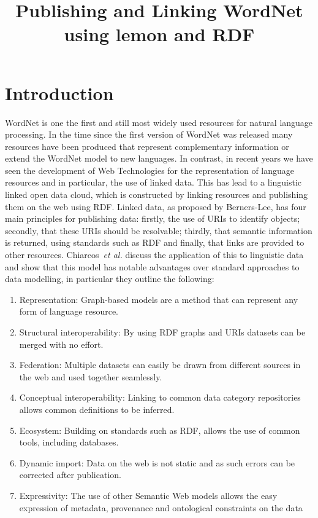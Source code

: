 \documentclass[10pt, a4paper]{article}
\title{Publishing and Linking WordNet using lemon and RDF}
\begin{document}
\maketitleabstract

\section{Introduction}

WordNet is one the first and still most widely used resources for natural
language processing. In the time since the first version of WordNet was released many
resources have been produced that represent complementary information\cite{?,?} or extend
the WordNet model to new languages\cite{?,?}. In contrast, in recent years we have seen
the development of Web Technologies for the representation of language resources
and in particular, the use of linked data. This has lead to a linguistic linked
open data cloud, which is constructed by linking resources and publishing them
on the web using RDF. Linked data, as proposed by Berners-Lee\cite{?}, has four
main principles for publishing data: firstly, the use of URIs to identify
objects; secondly, that these URIs should be resolvable; thirdly, that semantic
information is returned, using standards such as RDF and finally, that links are
provided to other resources. Chiarcos~\emph{et al.}\cite{?} discuss the
application of this to linguistic data and show that this model has notable
advantages over standard approaches to data modelling, in particular they
outline the following:

\begin{enumerate}
    \item Representation: Graph-based models are a method that can represent any
        form of language resource.
    \item Structural interoperability: By using RDF graphs and URIs datasets can
        be merged with no effort.
    \item Federation: Multiple datasets can easily be drawn from different
        sources in the web and used together seamlessly.
    \item Conceptual interoperability: Linking to common data category
        repositories allows common definitions to be inferred.
    \item Ecosystem: Building on standards such as RDF, allows the use of common
        tools, including databases.
    \item Dynamic import: Data on the web is not static and as such errors can
        be corrected after publication.
    \item Expressivity: The use of other Semantic Web models allows the easy
        expression of metadata, provenance and ontological constraints on the
        data
\end{enumerate}
\end{document}
